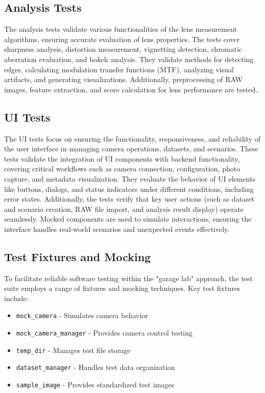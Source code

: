 \subsection{Analysis Tests}
The analysis tests validate various functionalities of the lens measurement algorithms, ensuring accurate evaluation of lens properties. The tests cover sharpness analysis, distortion measurement, vignetting detection, chromatic aberration evaluation, and bokeh analysis. They validate methods for detecting edges, calculating modulation transfer functions (MTF), analyzing visual artifacts, and generating visualizations. Additionally, preprocessing of RAW images, feature extraction, and score calculation for lens performance are tested..

\subsection{UI Tests}
The UI tests focus on ensuring the functionality, responsiveness, and reliability of the user interface in managing camera operations, datasets, and scenarios. These tests validate the integration of UI components with backend functionality, covering critical workflows such as camera connection, configuration, photo capture, and metadata visualization. They evaluate the behavior of UI elements like buttons, dialogs, and status indicators under different conditions, including error states. Additionally, the tests verify that key user actions (such as dataset and scenario creation, RAW file import, and analysis result display) operate seamlessly. Mocked components are used to simulate interactions, ensuring the interface handles real-world scenarios and unexpected events effectively.

\subsection{Test Fixtures and Mocking}
To facilitate reliable software testing within the "garage lab" approach, the test suite employs a range of fixtures and mocking techniques. Key test fixtures include:

\begin{itemize}
    \item \texttt{mock\_camera} - Simulates camera behavior
    \item \texttt{mock\_camera\_manager} - Provides camera control testing
    \item \texttt{temp\_dir} - Manages test file storage
    \item \texttt{dataset\_manager} - Handles test data organization
    \item \texttt{sample\_image} - Provides standardized test images
\end{itemize}

